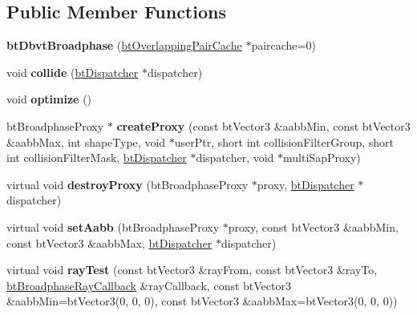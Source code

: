 \subsection*{Public Member Functions}
\begin{DoxyCompactItemize}
\item 
\mbox{\label{structbtDbvtBroadphase_a8a7d83c74abbacde98e22f16eebed62c}} 
{\bfseries bt\+Dbvt\+Broadphase} (\hyperlink{classbtOverlappingPairCache}{bt\+Overlapping\+Pair\+Cache} $\ast$paircache=0)
\item 
\mbox{\label{structbtDbvtBroadphase_a3885d96310bbc87422c5b4b5f35db7e9}} 
void {\bfseries collide} (\hyperlink{classbtDispatcher}{bt\+Dispatcher} $\ast$dispatcher)
\item 
\mbox{\label{structbtDbvtBroadphase_a63bb26aa6b0ad6e91c5fbc938358d93b}} 
void {\bfseries optimize} ()
\item 
\mbox{\label{structbtDbvtBroadphase_a62f29aee3e22e2e3cafcda46265353de}} 
bt\+Broadphase\+Proxy $\ast$ {\bfseries create\+Proxy} (const bt\+Vector3 \&aabb\+Min, const bt\+Vector3 \&aabb\+Max, int shape\+Type, void $\ast$user\+Ptr, short int collision\+Filter\+Group, short int collision\+Filter\+Mask, \hyperlink{classbtDispatcher}{bt\+Dispatcher} $\ast$dispatcher, void $\ast$multi\+Sap\+Proxy)
\item 
\mbox{\label{structbtDbvtBroadphase_a21ba695c249dac8919b4a3cc2c053d8e}} 
virtual void {\bfseries destroy\+Proxy} (bt\+Broadphase\+Proxy $\ast$proxy, \hyperlink{classbtDispatcher}{bt\+Dispatcher} $\ast$dispatcher)
\item 
\mbox{\label{structbtDbvtBroadphase_aeb9fdc20e198ded65a6aa8616b4873b4}} 
virtual void {\bfseries set\+Aabb} (bt\+Broadphase\+Proxy $\ast$proxy, const bt\+Vector3 \&aabb\+Min, const bt\+Vector3 \&aabb\+Max, \hyperlink{classbtDispatcher}{bt\+Dispatcher} $\ast$dispatcher)
\item 
\mbox{\label{structbtDbvtBroadphase_a8d384e420a20ab64c1d3fac0ee12563a}} 
virtual void {\bfseries ray\+Test} (const bt\+Vector3 \&ray\+From, const bt\+Vector3 \&ray\+To, \hyperlink{structbtBroadphaseRayCallback}{bt\+Broadphase\+Ray\+Callback} \&ray\+Callback, const bt\+Vector3 \&aabb\+Min=bt\+Vector3(0, 0, 0), const bt\+Vector3 \&aabb\+Max=bt\+Vector3(0, 0, 0))

\end{DoxyCompactItemize}
